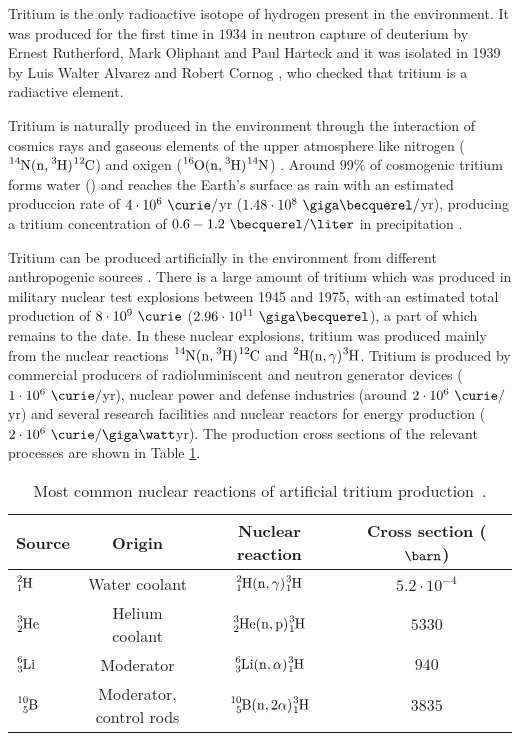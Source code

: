 Tritium is the only radioactive isotope of hydrogen present in the environment. It was produced for the first time in $1934$ in neutron capture of deuterium by Ernest Rutherford, Mark Oliphant and Paul Harteck \cite{TritiumDiscovery} and it was isolated in 1939 by Luis Walter Alvarez and Robert Cornog \cite{TritiumIsolate}, who checked that tritium is a radiactive element. 

Tritium is naturally produced in the environment through the interaction of cosmics rays and gaseous elements of the upper atmosphere like nitrogen ($\ce{^{14}N}(\ce{n},\ce{^{3}H})\ce{^{12}C}$) \cite{TritiumHandling} and oxigen ($\ce{^{16}O}(\ce{n},\ce{^{3}H})\ce{^{14}N}$) \cite{OxigenTritium}. Around 99\% of cosmogenic tritium forms water () and reaches the Earth's surface as rain with an estimated produccion rate of $4\cdot 10^6 ~\curie/$yr ($1.48 \cdot 10^8 ~\giga\becquerel/$yr), producing a tritium concentration of $0.6-1.2~\becquerel/\liter$ in precipitation \cite{CommonEmissionTritium, TritiumHandling}. 

Tritium can be produced artificially in the environment from different anthropogenic sources \cite{CommonEmissionTritium, TritiumHandling}. There is a large amount of tritium which was produced in military nuclear test explosions between 1945 and 1975, with an estimated total production of $8 \cdot 10^9~\curie$ ($2.96 \cdot 10^{11}~\giga\becquerel$), a part of which remains to the date. In these nuclear explosions, tritium was produced mainly from the nuclear reactions $\ce{^{14}N}(\ce{n},\ce{^{3}H})\ce{^{12}C}$ and $\ce{^{2}H}(\ce{n},\gamma)\ce{^{3}H}$. Tritium is produced by commercial producers of radioluminiscent and neutron generator devices ($1 \cdot 10^6~\curie/$yr), nuclear power and defense industries (around $2 \cdot 10^6~\curie/$yr) and several research facilities and nuclear reactors for energy production ($2 \cdot 10^6~\curie/\giga\watt$yr). The production cross sections of the relevant processes are shown in Table \ref{tab:NuclearReactionsTritiumProduction}.

\begin{table}[htbp]
\centering{}%
\begin{tabular}{lccc}
\toprule 
Source & Origin & Nuclear reaction & Cross section ($\barn$)\tabularnewline
\midrule
\midrule 
$\ce{^{2}_{1}H}$ & Water coolant & $\ce{^{2}_{1}H}(\ce{n},\gamma)\ce{^{3}_{1}H}$ & $5.2 \cdot{} 10^{-4}$ \tabularnewline
$\ce{^{3}_{2}He}$ & Helium coolant & $\ce{^{3}_{2}He}(\ce{n},\ce{p})\ce{^{3}_{1}H}$ & $5330$ \tabularnewline
\vspace{0.1cm}$\ce{^{6}_{3}Li}$ & Moderator & $\ce{^{6}_{3}Li}(\ce{n},\alpha)\ce{^{3}_{1}H}$ & $940$ \tabularnewline
$\ce{^{10}_{5}B}$ & \parbox{8em}{\centering Moderator,\\ control rods} & $\ce{^{10}_{5}B}(\ce{n},2\alpha)\ce{^{3}_{1}H}$ & $3835$ \tabularnewline 
\bottomrule
\end{tabular}
\caption{Most common nuclear reactions of artificial tritium production~\cite{CommonEmissionTritium}.}
\label{tab:NuclearReactionsTritiumProduction}
\end{table}

